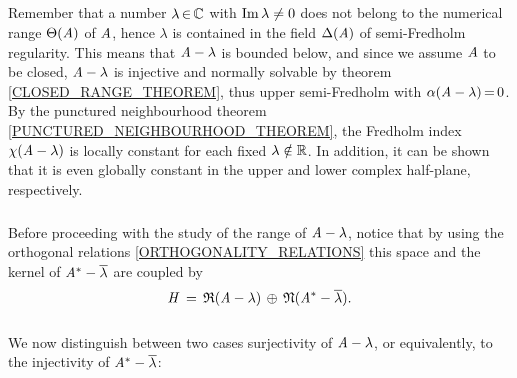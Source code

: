 \documentclass[11pt,twoside]{article}
\begin{document}
\subparagraph*{} %
Remember that a number $\lambda {\,\in\,} {\mathbb{C}}$ with $\operatorname{Im} \lambda \neq 0$
does not belong to the numerical range $\Theta(\mathit{A})$ of $\mathit{A}$,
hence $\lambda$ is contained in the field $\Delta(\mathit{A})$
of semi-Fredholm regularity.
%
This means that
$\mathit{A} - \lambda$ is bounded below,
and since we assume $\mathit{A}$ to be closed,
$\mathit{A} - \lambda$ is injective and normally solvable
by theorem \ref{CLOSED_RANGE_THEOREM},
thus upper semi-Fredholm with $\alpha(\mathit{A}-\lambda) {\,=\,} 0$.
By the punctured neighbourhood theorem \ref{PUNCTURED_NEIGHBOURHOOD_THEOREM},
the Fredholm index $\chi(\mathit{A} - \lambda)$
is locally constant for each fixed $\lambda \notin {\mathbb{R}}$.
In addition,
it can be shown that it is even globally constant
in the upper and lower complex half-plane,
respectively.

\subparagraph*{}
Before proceeding with the study of the range of $\mathit{A}-\lambda$,
notice that by using the orthogonal relations \eqref{ORTHOGONALITY_RELATIONS}
this space and the kernel of $\mathit{A}^*-\overline{\lambda}$
are coupled by
\[
\mathit{H} \,=\,
\mathfrak{R}(\mathit{A} - \lambda)
\, \oplus \,
\mathfrak{N}(\mathit{A}^* - \overline{\lambda}).
\]

\subparagraph*{}
We now distinguish between two cases
{\wrt} surjectivity of $\mathit{A} - \lambda$,
or equivalently,
to the injectivity of $\mathit{A}^* - \overline{\lambda}$:
\end{document}
